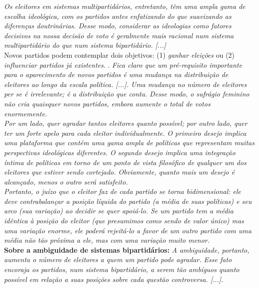 \textit{Os eleitores em sistemas multipartidários, entretanto, têm uma ampla gama de escolha ideológica, com os partidos antes enfatizando do que suavizando as diferenças doutrinárias. Desse modo, considerar as ideologias como fatores decisivos na nossa decisão de voto é geralmente mais racional num sistema multipartidário do que num sistema bipartidário. [...]} \cite[~p. 147-148]{downs} \\

\noindent Novos partidos podem contemplar dois objetivos: (1) \textit{ganhar eleições} ou (2) \textit{influenciar partidos já existentes}. \cite[~p. 148]{downs}. \textit{Fica claro que um pré-requisito importante para o aparecimento de novos partidos é uma mudança na distribuição de eleitores ao longo da escala política. [...]. Uma mudança no número de eleitores per se é irrelevante; é a distribuição que conta. Desse modo, o sufrágio feminino não cria quaisquer novos partidos, embora aumente o total de votos enormemente.} \cite[~p. 151-152]{downs}\\

\noindent \textit{Por um lado, quer agradar tantos eleitores quanto possível; por outro lado, quer ter um forte apelo para cada eleitor individualmente. O primeiro desejo implica uma plataforma que contém uma gama ampla de políticas que representam muitas perspectivas ideológicas diferentes. O segundo desejo implica uma integração íntima de políticas em torno de um ponto de vista filosófico de qualquer um dos eleitores que estiver sendo cortejado. Obviamente, quanto mais um desejo é alcançado, menos o outro será satisfeito.} \cite[~p. 153]{downs}\\

\noindent \textit{Portanto, o juízo que o eleitor faz de cada partido se torna bidimensional: ele deve contrabalançar a posição líquida do partido (a média de suas políticas) e seu arco (sua variação) ao decidir se quer apoiá-lo. Se um partido tem a média idêntica à posição do eleitor (que presumimos como sendo de valor único) mas uma variação enorme, ele poderá rejeitá-lo a favor de um outro partido com uma média não tão próxima a ele, mas com uma variação muito menor.} \cite[~p. 154]{downs}\\

\noindent \textbf{Sobre a ambiguidade de sistemas bipartidários:} \textit{A ambiguidade, portanto, aumenta o número de eleitores a quem um partido pode agradar. Esse fato encoraja os partidos, num sistema bipartidário, a serem tão ambíguos quanto possível em relação a suas posições sobre cada questão controversa. [...].}

